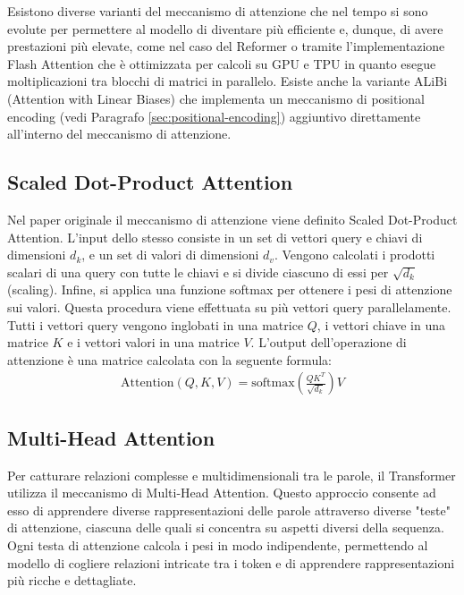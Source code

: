 Esistono diverse varianti del meccanismo di attenzione che nel tempo si sono evolute per permettere al modello di diventare più efficiente e, dunque, di avere prestazioni più elevate, come nel caso del Reformer \cite{kitaev2020reformerefficienttransformer} o tramite l'implementazione Flash Attention \cite{dao2022flashattentionfastmemoryefficientexact} che è ottimizzata per calcoli su GPU e TPU in quanto esegue moltiplicazioni tra blocchi di matrici in parallelo. Esiste anche la variante ALiBi (Attention with Linear Biases) \cite{press2022trainshorttestlong} che implementa un meccanismo di positional encoding (vedi Paragrafo \ref{sec:positional-encoding}) aggiuntivo direttamente all'interno del meccanismo di attenzione.

\subsection{Scaled Dot-Product Attention}
Nel paper originale il meccanismo di attenzione viene definito Scaled Dot-Product Attention. L'input dello stesso consiste in un set di vettori query e chiavi di dimensioni \(d_k\), e un set di valori di dimensioni \(d_v\). Vengono calcolati i prodotti scalari di una query con tutte le chiavi e si divide ciascuno di essi per \(\sqrt{d_k}\) (scaling). Infine, si applica una funzione softmax per ottenere i pesi di attenzione sui valori.
Questa procedura viene effettuata su più vettori query parallelamente. Tutti i vettori query vengono inglobati in una matrice \(Q\), i vettori chiave in una matrice \(K\) e i vettori valori in una matrice \(V\). L'output dell'operazione di attenzione è una matrice calcolata con la seguente formula:
\begin{align*}
	\text{Attention}(Q, K, V) = \text{softmax}\left(\frac{QK^T}{\sqrt{d_k}}\right)V
\end{align*}

\subsection{Multi-Head Attention}
Per catturare relazioni complesse e multidimensionali tra le parole, il Transformer utilizza il meccanismo di Multi-Head Attention. Questo approccio consente ad esso di apprendere diverse rappresentazioni delle parole attraverso diverse "teste" di attenzione, ciascuna delle quali si concentra su aspetti diversi della sequenza. Ogni testa di attenzione calcola i pesi in modo indipendente, permettendo al modello di cogliere relazioni intricate tra i token e di apprendere rappresentazioni più ricche e dettagliate.

